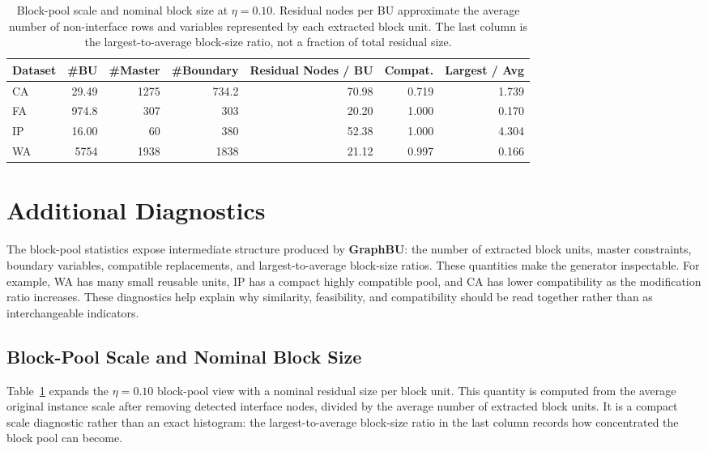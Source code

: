 \documentclass[letterpaper]{article}
\newcommand{\method}{\textbf{GraphBU}\xspace}
\begin{document}
\begin{table}[!t]
\vspace{6pt}
\small
\setlength{\tabcolsep}{5pt}
\renewcommand{\arraystretch}{0.98}
\caption{Block-pool scale and nominal block size at $\eta=0.10$. Residual nodes per BU approximate the average number of non-interface rows and variables represented by each extracted block unit. The last column is the largest-to-average block-size ratio, not a fraction of total residual size.}
\label{tab:app_block_scale}
\begin{tabular}{@{}lrrrrrr@{}}
\toprule
\textbf{Dataset} & \textbf{\#BU} & \textbf{\#Master} & \textbf{\#Boundary} & \textbf{Residual Nodes / BU} & \textbf{Compat.} & \textbf{Largest / Avg} \\
\midrule
CA & 29.49 & 1275 & 734.2 & 70.98 & 0.719 & 1.739 \\
FA & 974.8 & 307 & 303 & 20.20 & 1.000 & 0.170 \\
IP & 16.00 & 60 & 380 & 52.38 & 1.000 & 4.304 \\
WA & 5754 & 1938 & 1838 & 21.12 & 0.997 & 0.166 \\
\bottomrule
\end{tabular}
\end{table}

\section{Additional Diagnostics}

The block-pool statistics expose intermediate structure produced by
\method: the number of extracted block units, master constraints,
boundary variables, compatible replacements, and largest-to-average
block-size ratios.
These quantities make the generator inspectable. For example, WA has many small reusable units, IP has a
compact highly compatible pool, and CA has lower compatibility as the
modification ratio increases. These diagnostics help explain why
similarity, feasibility, and compatibility should be read together
rather than as interchangeable indicators.

\subsection{Block-Pool Scale and Nominal Block Size}

Table~\ref{tab:app_block_scale} expands the $\eta=0.10$ block-pool view
with a nominal residual size per block unit. This quantity is computed
from the average original instance scale after removing detected
interface nodes, divided by the average number of extracted block
units. It is a compact scale diagnostic rather than an exact histogram:
the largest-to-average block-size ratio in the last column records how
concentrated the block pool can become.

\endgroup
\end{document}
